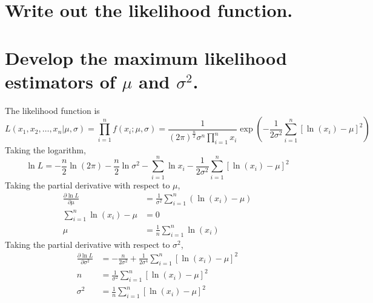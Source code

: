 \documentclass[answers]{exam}
\begin{document}
\begin{questions}

\begin{parts}
    \part{Write out the likelihood function.}
    \part{Develop the maximum likelihood estimators of $\mu$ and $\sigma^2$.}
\end{parts}

\begin{solution}
    The likelihood function is
    $$L(x_1,x_2,\dots,x_n|\mu,\sigma) = \prod_{i=1}^n f(x_i;\mu,\sigma) = \frac{1}{(2\pi)^{\frac{n}{2}}\sigma^n\prod_{i=1}^nx_i} \exp\left(-\frac{1}{2\sigma^2}\sum_{i=1}^n [\ln(x_i) - \mu]^2\right)$$
    Taking the logarithm,
    $$\ln L = -\frac{n}{2}\ln(2\pi) - \frac{n}{2}\ln\sigma^2 - \sum_{i=1}^n \ln x_i - \frac{1}{2\sigma^2} \sum_{i=1}^n [\ln(x_i) - \mu]^2$$
    Taking the partial derivative with respect to $\mu$,
    \begin{align*}
        \frac{\partial \ln L}{\partial \mu} &= \frac{1}{\sigma^2} \sum_{i=1}^n (\ln(x_i) - \mu) \\
        \sum_{i=1}^n \ln(x_i) - \mu &= 0 \\
        \mu &= \frac{1}{n} \sum_{i=1}^n \ln(x_i)
    \end{align*}
    Taking the partial derivative with respect to $\sigma^2$,
    \begin{align*}
        \frac{\partial \ln L}{\partial \sigma^2} &= -\frac{n}{2\sigma^2} + \frac{1}{2\sigma^4} \sum_{i=1}^n [\ln(x_i) - \mu]^2 \\
        n &= \frac{1}{\sigma^2} \sum_{i=1}^n [\ln(x_i) - \mu]^2 \\
        \sigma^2 &= \frac{1}{n} \sum_{i=1}^n [\ln(x_i) - \mu]^2
    \end{align*}
\end{solution}



\end{questions}
\end{document}

